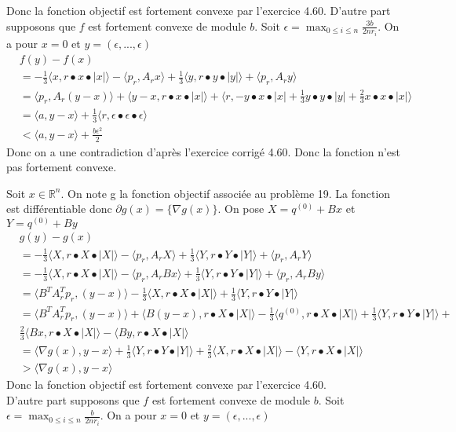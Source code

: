 \documentclass[12pt, letterpaper]{article}
\newcommand{\R}{\mathbb{R}^n}
\begin{document}
Donc la fonction objectif est fortement convexe par l'exercice 4.60. 
D'autre part supposons que $f$ est fortement convexe de module $b$. Soit $\epsilon =  \max_{0\leq i \leq n} \frac{3b}{2nr_i}$. On a pour $x = 0$ et $y = (\epsilon,...,\epsilon)$
\begin{align*}
&f(y) - f(x) \\
&= -\frac{1}{3} \langle x,r \bullet x \bullet |x|\rangle  - \langle p_r,A_rx\rangle  + \frac{1}{3}\langle y,r \bullet y \bullet |y|\rangle  + \langle p_r,A_ry\rangle   \\
&= \langle p_r,A_r(y - x)\rangle  + \langle y-x, r \bullet x \bullet |x|\rangle  + \langle r, -y \bullet x \bullet |x| + \frac{1}{3}y \bullet y \bullet |y| + \frac{2}{3}x \bullet x \bullet |x|\rangle \\
&= \langle a,y-x\rangle   + \frac{1}{3}\langle r, \epsilon \bullet \epsilon \bullet \epsilon\rangle  \\
&<  \langle a,y-x\rangle  + \frac{b \epsilon^2}{2}
\end{align*}
Donc on a une contradiction d'après l'exercice corrigé 4.60. Donc la fonction n'est pas fortement convexe.

Soit $x\in\R$. On note g la fonction objectif associée au problème 19. La fonction est différentiable donc $\partial g(x) = \{\nabla g(x)\}$. On pose $X = q^{(0)} + Bx$ et $Y = q^{(0)} + By$
\begin{align*}
&g(y) - g(x) \\
&= -\frac{1}{3} \langle X,r \bullet X \bullet |X|\rangle  - \langle p_r,A_rX\rangle  + \frac{1}{3}\langle Y,r \bullet Y \bullet |Y|\rangle  + \langle p_r,A_rY\rangle   \\
&= -\frac{1}{3} \langle X,r \bullet X \bullet |X|\rangle  - \langle p_r,A_rBx\rangle  + \frac{1}{3}\langle Y,r \bullet Y \bullet |Y|\rangle  + \langle p_r,A_rBy\rangle   \\
&= \langle B^TA_r^Tp_r,(y - x)\rangle -\frac{1}{3} \langle X,r \bullet X \bullet |X|\rangle + \frac{1}{3}\langle Y,r \bullet Y \bullet |Y|\rangle \\
&= \langle B^TA_r^Tp_r,(y - x)\rangle + \langle B(y-x),r \bullet X \bullet |X|\rangle - \frac{1}{3}\langle q^{(0)},r \bullet X \bullet |X|\rangle + \frac{1}{3}\langle Y,r \bullet Y \bullet |Y|\rangle + \\
&\frac{2}{3} \langle Bx,r \bullet X \bullet |X|\rangle -  \langle By,r \bullet X \bullet |X|\rangle\\
&=  \langle \nabla g(x),y-x\rangle + \frac{1}{3}\langle Y,r \bullet Y \bullet |Y|\rangle + \frac{2}{3} \langle X,r \bullet X \bullet |X|\rangle -  \langle Y,r \bullet X \bullet |X|\rangle \\
&> \langle \nabla g(x),y-x\rangle \tag{Par le lemme du début}
\end{align*}
Donc la fonction objectif est fortement convexe par l'exercice 4.60. \\
D'autre part supposons que $f$ est fortement convexe de module $b$. Soit $\epsilon =  \max_{0\leq i \leq n} \frac{b}{2nr_i}$. On a pour $x = 0$ et $y = (\epsilon,...,\epsilon)$
\end{document}
